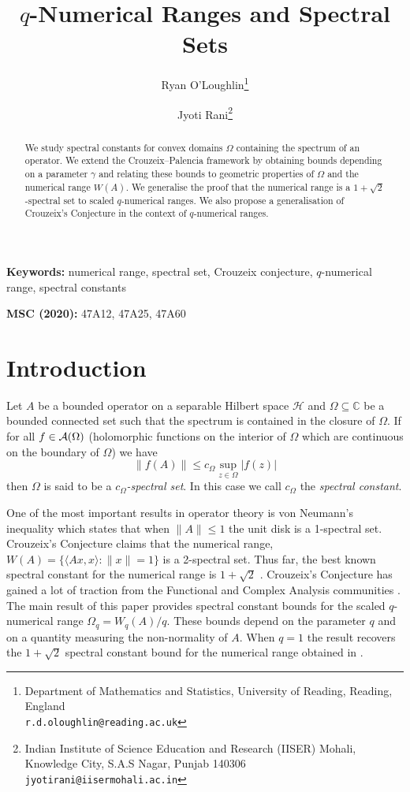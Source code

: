\documentclass{article}
\title{$q$-Numerical Ranges and Spectral Sets}
\author{
Ryan O'Loughlin\thanks{Department of Mathematics and Statistics, University of Reading,
Reading, England\\ \texttt{r.d.oloughlin@reading.ac.uk}}
\and
Jyoti Rani\thanks{Indian Institute of Science Education and Research (IISER) Mohali, Knowledge City, S.A.S Nagar, Punjab 140306\\ \texttt{jyotirani@iisermohali.ac.in}}
}
\date{}
\begin{document}
\maketitle

\begin{abstract}
We study spectral constants for convex domains $\Omega$ containing the spectrum of an operator. We extend the Crouzeix–Palencia framework by obtaining bounds depending on a parameter $\gamma$ and relating these bounds to geometric properties of $\Omega$ and the numerical range $W(A)$. We generalise the proof that the numerical range is a $1+\sqrt{2}$-spectral set to scaled $q$-numerical ranges. We also propose a generalisation of Crouzeix's Conjecture in the context of $q$-numerical ranges.
\end{abstract}

\medskip

\noindent\textbf{Keywords:} numerical range, spectral set, Crouzeix conjecture, $q$-numerical range, spectral constants

\medskip

\noindent\textbf{MSC (2020):} 47A12, 47A25, 47A60


\section{Introduction}

Let $A$ be a bounded operator on a separable Hilbert space $\mathcal{H}$ and $\Omega \subseteq \mathbb{C}$ be a bounded connected set such that the spectrum is contained in the closure of $ \Omega $. If for all $f \in {\cal A} ( \Omega )$ (holomorphic functions on the interior of $\Omega$ which are continuous on the boundary of $\Omega$) we have
$$
\| f(A) \| \leq c_{\Omega} \sup_{z \in \Omega} |f(z)|
$$
then $\Omega$ is said to be a \textit{$c_{\Omega}$-spectral set}. In this case we call $c_{\Omega}$ the \textit{spectral constant}.

One of the most important results in operator theory is von Neumann's inequality which states that when $\|A\| \leq 1$ the unit disk is a 1-spectral set. Crouzeix's Conjecture claims that the numerical range, $W(A) = \{ \langle Ax,x \rangle :  \|x\| = 1 \}$ is a 2-spectral set. Thus far, the best known spectral constant for the numerical range is $1+ \sqrt{2}$ \cite{1root2, ransford2018remarks}. Crouzeix's Conjecture has gained a lot of traction from the Functional and Complex Analysis communities \cite{o2024crouzeix, CC11.08, CC2matrix, CC3by3, CCgorkin, CCincreasing, CCLi, CCpalenciaextension, CCnilpotent, CCnum, malman2024double, 1root2, CCpalenciaextension, mashreghi2025schwarz}. The main result of this paper provides spectral constant bounds for the scaled
$q$-numerical range $\Omega_q = W_q(A)/q$. These bounds depend on the parameter
$q$ and on a quantity measuring the non-normality of $A$. When $q=1$ the result recovers the
$1+\sqrt{2}$ spectral constant bound for the numerical range obtained in
\cite{1root2}.
\end{document}
